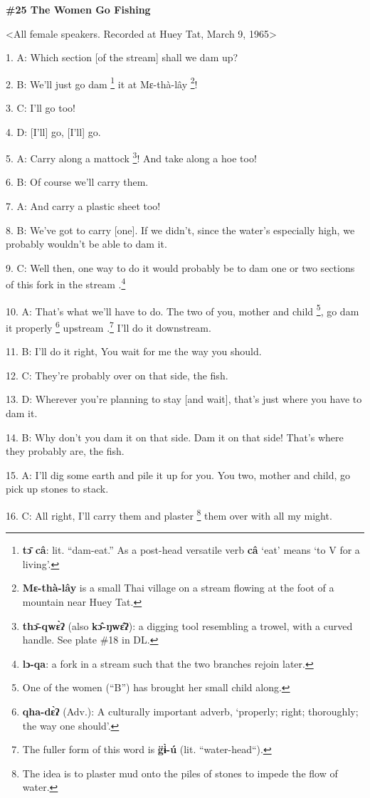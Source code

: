 
\textbf{\#25 The Women Go Fishing}

<All female speakers. Recorded at Huey Tat, March 9, 1965>

1. A: Which section [of the stream] shall we dam up?

2. B: We'll just go dam \footnote{\textbf{tɔ̄ câ}: lit. ``dam-eat.'' As a post-head versatile verb \textbf{câ }`eat' means `to V for a living'.} it at Mɛ-thà-lây \footnote{\textbf{Mɛ-thà-lây} is a small Thai village on a stream flowing at the foot of a mountain near Huey Tat.}!

3. C: I'll go too!

4. D: [I'll] go, [I'll] go.

5. A: Carry along a mattock \footnote{\textbf{thɔ̄-qwɛ̀ʔ} (also \textbf{kɔ̂-ŋwɛ̂ʔ}): a digging tool resembling a trowel, with a curved handle. See plate \#18 in DL.}! And take along a hoe too!

6. B: Of course we'll carry them.

7. A: And carry a  plastic sheet too!

8. B: We've got to carry [one]. If we didn't, since the water's especially high,
we probably wouldn't be able to dam it.

9. C: Well then, one way to do it would probably be to dam one or two sections
of this fork in the stream .\footnote{\textbf{lɔ-qa}: a fork in a stream such that the two branches rejoin later.}

10. A: That's what we'll have to do. The two of you, mother and child \footnote{One of the women (``B'') has brought her small child along.}, go dam
it properly \footnote{\textbf{qha-dɛ̀ʔ} (Adv.): A culturally important adverb, `properly; right; thoroughly; the way one should'.} upstream .\footnote{The fuller form of this word is \textbf{g̈ɨ̀-ú} (lit. ``water-head``).} I'll do it downstream.

11. B: I'll do it right, You wait for me the way you should.

12. C: They're probably over on that side, the fish.

13. D: Wherever you're planning to stay [and wait], that's just where you have
to dam it.

14. B: Why don't you dam it on that side. Dam it on that side! That's where they
probably are, the fish.

15. A: I'll dig some earth and pile it up for you.  You two, mother and child,
go pick up stones to stack.

16. C: All right, I'll carry them and plaster \footnote{The idea is to plaster mud onto the piles of stones to impede the flow of water.} them over with all my might.
